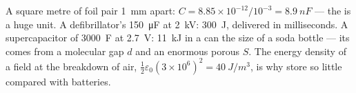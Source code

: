 \begin{example}\label{ex:b1:potential-capacitors:energies}
A square metre of foil pair \qty{1}{mm} apart: $C = 8.85 \times 10^{-12}/
10^{-3} = \qty{8.9}{nF}$ --- the  is a huge unit. A defibrillator's
\qty{150}{\micro F} at \qty{2}{kV}: \qty{300}{J}, delivered in milliseconds.
A supercapacitor of \qty{3000}{F} at \qty{2.7}{V}: \qty{11}{kJ} in a can
the size of a soda bottle --- its  comes from a molecular
gap $d$ and an enormous porous $S$. The energy density of a field at
the breakdown of air, $\tfrac12\varepsilon_0(3 \times 10^6)^2 = \qty{40}{J/m^3}$, is
why  store so little compared with batteries.
\end{example}

